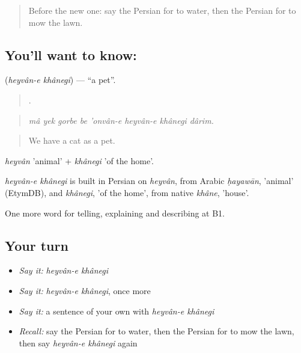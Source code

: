 \label{lesson:FA-C539-heyvan-e-khanegi}



\begin{quote}
Before the new one: say the Persian for to water, then the Persian for to mow the lawn.
\end{quote}

\subsection*{You'll want to know:  }
\textbf{ } (\emph{heyvân-e khânegi}) — \textquotedblleft{}a pet\textquotedblright{}.

\begin{quote}
       .
\end{quote}

\begin{quote}
\emph{mâ yek gorbe be 'onvân-e heyvân-e khânegi dârim.}
\end{quote}

\begin{quote}
We have a cat as a pet.
\end{quote}

\emph{heyvân} 'animal' + \emph{khânegi} 'of the home'.

\begin{cousinweb}
\emph{heyvân-e khânegi} is built in Persian on \emph{heyvân}, from Arabic \emph{ḥayawān}, 'animal' (EtymDB), and \emph{khânegi}, 'of the home', from native \emph{khâne}, 'house'.
\end{cousinweb}

\begin{grammarlens}[title={What you've built}]
One more word for telling, explaining and describing at B1.
\end{grammarlens}

\subsection*{Your turn}
\begin{itemize}
\raggedright
  \item \emph{Say it:} \emph{heyvân-e khânegi}
  \item \emph{Say it:} \emph{heyvân-e khânegi}, once more
  \item \emph{Say it:} a sentence of your own with \emph{heyvân-e khânegi}
  \item \emph{Recall:} say the Persian for to water, then the Persian for to mow the lawn, then say \emph{heyvân-e khânegi} again
\end{itemize}

